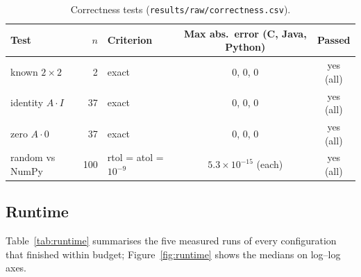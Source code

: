\documentclass[11pt,a4paper]{article}
\begin{document}
\begin{table}[H]
\centering\small
\begin{tabular}{lrlcc}
\toprule
Test & $n$ & Criterion & Max abs.\ error (C, Java, Python) & Passed \\
\midrule
known $2\times2$ & 2 & exact & 0, 0, 0 & yes (all) \\
identity $A\cdot I$ & 37 & exact & 0, 0, 0 & yes (all) \\
zero $A\cdot 0$ & 37 & exact & 0, 0, 0 & yes (all) \\
random vs NumPy & 100 & rtol = atol = $10^{-9}$ & $5.3\times10^{-15}$ (each) & yes (all) \\
\bottomrule
\end{tabular}
\caption{Correctness tests (\texttt{results/raw/correctness.csv}).}
\label{tab:correct}
\end{table}

\needspace{0.5\textheight}
\subsection{Runtime}
Table~\ref{tab:runtime} summarises the five measured runs of every configuration that
finished within budget; Figure~\ref{fig:runtime} shows the medians on log--log axes.
\end{document}
